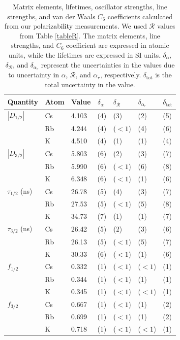 \documentclass[twocolumn,prl,showpacs,superscriptaddress]{revtex4-1}   %
\begin{document}
\begingroup
\begin{table}
\caption{\label{tableMisc}Matrix elements, lifetimes, oscillator strengths, line strengths, and van der Waals $C_6$ coefficients calculated from our polarizability measurements.
We used $\mathcal{R}$ values from Table \ref{tableR}. The matrix elements, line strengths, and $C_6$ coefficient are expressed in atomic units, while the lifetimes are expressed in SI units.
$\delta_{\alpha}$, $\delta_{\mathcal{R}}$, and $\delta_{\alpha_r}$ represent the uncertainties in the values due to uncertainty in $\alpha$, $\mathcal{R}$, and $\alpha_r$, respectively. $\delta_{\mathrm{tot}}$ is the total uncertainty in the value.}
\begin{center}
\begin{tabular}{lllllll}
\hline\hline
Quantity & Atom & Value & $\delta_{\alpha}$ & $\delta_{\mathcal{R}}$ & $\delta_{\alpha_r}$ & $\delta_{\mathrm{tot}}$ \\
\hline
$|D_{1/2}|$ 		& Cs & 4.103 & (4) & (3) & (2) & (5) \\
 					& Rb & 4.244 & (4) & ($<1$) & (4) & (6) \\
 					& K  & 4.510 & (4) & (1) & (1) & (4) \\ \hline
$|D_{3/2}|$ 		& Cs & 5.803 & (6) & (2) & (3) & (7) \\
 					& Rb & 5.990 & (6) & ($<1$) & (6) & (8) \\
 					& K  & 6.348 & (6) & ($<1$) & (1) & (6) \\ \hline
$\tau_{1/2}$ (ns) 	& Cs & 26.78 & (5) & (4) & (3) & (7) \\
 					& Rb & 27.53 & (5) & ($<1$) & (5) & (8) \\
 					& K  & 34.73 & (7) & (1) & (1) & (7) \\ \hline
$\tau_{3/2}$ (ns) 	& Cs & 26.42 & (5) & (2) & (3) & (6) \\
 					& Rb & 26.13 & (5) & ($<1$) & (5) & (7) \\
 					& K  & 30.33 & (6) & ($<1$) & (1) & (6) \\ \hline
$f_{1/2}$ 			& Cs & 0.332 & (1) & ($<1$) & ($<1$) & (1) \\
 					& Rb & 0.344 & (1) & ($<1$) & (1) & (1) \\
 					& K  & 0.345 & (1) & ($<1$) & ($<1$) & (1) \\ \hline
$f_{3/2}$ 			& Cs & 0.667 & (1) & ($<1$) & (1) & (2) \\
 					& Rb & 0.699 & (1) & ($<1$) & (1) & (2) \\
 					& K  & 0.718 & (1) & ($<1$) & ($<1$) & (1) \\ \hline

\end{tabular}
\end{center}
\end{table}
\end{document}
